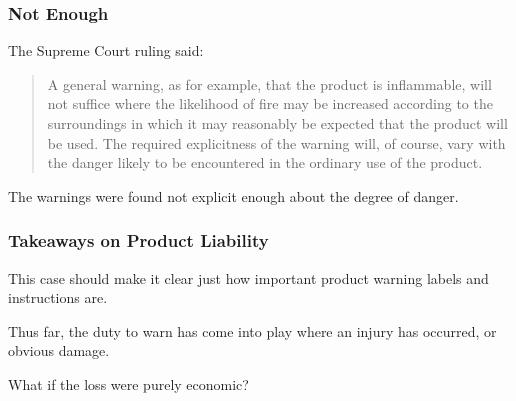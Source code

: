 \begin{frame}
\frametitle{Not Enough}
The Supreme Court ruling said:

\begin{quote}
 A general warning, as for example, that the product is inflammable, will not suffice where the likelihood of fire may be increased according to the surroundings in which it may reasonably be expected that the product will be used. The required explicitness of the warning will, of course, vary with the danger likely to be encountered in the ordinary use of the product.
\end{quote}

The warnings were found not explicit enough about the degree of danger.

\end{frame}



\begin{frame}
\frametitle{Takeaways on Product Liability}

This case should make it clear just how important product warning labels and instructions are.

Thus far, the duty to warn has come into play where an injury has occurred, or obvious damage. 

What if the loss were purely economic?

\end{frame}







